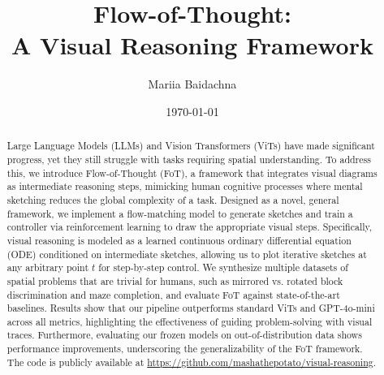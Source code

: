 \documentclass{l4proj}
\begin{document}
\title{Flow-of-Thought: \\ A Visual Reasoning Framework}
\author{Mariia Baidachna}
\date{\today}

\maketitle

\begin{abstract}
Large Language Models (LLMs) and Vision Transformers (ViTs) have made significant progress, yet they still struggle with tasks requiring spatial understanding. To address this, we introduce Flow-of-Thought (FoT), a framework that integrates visual diagrams as intermediate reasoning steps, mimicking human cognitive processes where mental sketching reduces the global complexity of a task. Designed as a novel, general framework, we implement a flow-matching model to generate sketches and train a controller via reinforcement learning to draw the appropriate visual steps. Specifically, visual reasoning is modeled as a learned continuous ordinary differential equation (ODE) conditioned on intermediate sketches, allowing us to plot iterative sketches at any arbitrary point $t$ for step-by-step control. We synthesize multiple datasets of spatial problems that are trivial for humans, such as mirrored vs. rotated block discrimination and maze completion, and evaluate FoT against state-of-the-art baselines. Results show that our pipeline outperforms standard ViTs and GPT-4o-mini across all metrics, highlighting the effectiveness of guiding problem-solving with visual traces. Furthermore, evaluating our frozen models on out-of-distribution data shows performance improvements, underscoring the generalizability of the FoT framework. The code is publicly available at \url{https://github.com/mashathepotato/visual-reasoning}.
\end{abstract}

\end{document}
